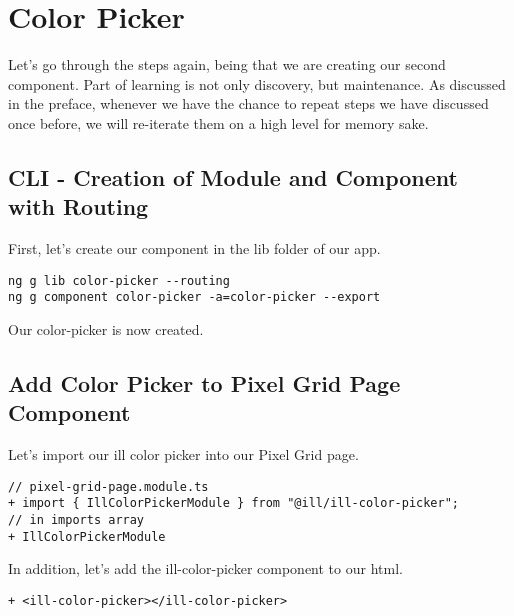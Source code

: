 \maketitle{}
\section{ Color Picker }

Let's go through the steps again, being that we are creating our second
component. Part of learning is not only discovery, but maintenance. As discussed
in the preface, whenever we have the chance to repeat steps we have discussed
once before, we will re-iterate them on a high level for memory sake.

\subsection{ CLI - Creation of Module and Component with Routing }
First, let's create our component in the lib folder of our app.

\begin{lstlisting}
ng g lib color-picker --routing
ng g component color-picker -a=color-picker --export
\end{lstlisting}

Our color-picker is now created.

\subsection{ Add Color Picker to Pixel Grid Page Component }
Let's import our ill color picker into our Pixel Grid page.

\begin{lstlisting}
// pixel-grid-page.module.ts
+ import { IllColorPickerModule } from "@ill/ill-color-picker";
// in imports array
+ IllColorPickerModule
\end{lstlisting}

In addition, let's add the ill-color-picker component to our html.
\begin{lstlisting}
+ <ill-color-picker></ill-color-picker>
\end{lstlisting}
